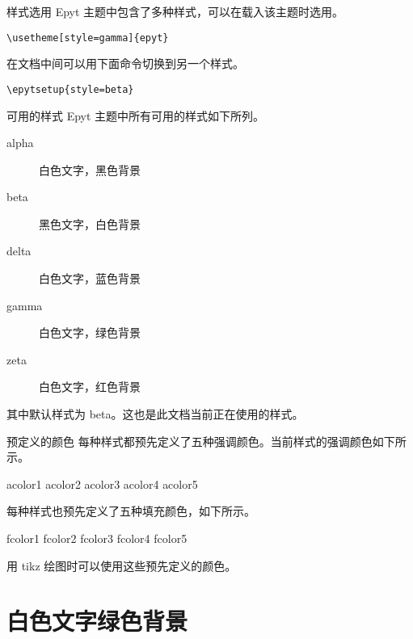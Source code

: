\documentclass[14pt,notheorems]{beamer}
\newcommand{\mylead}[1]{\textcolor{acolor1}{#1}}
\newcommand{\mybold}[1]{\textcolor{acolor2}{#1}}
\begin{document}
\begin{frame}[fragile]{样式选用}
\mylead{Epyt} 主题中包含了多种样式，可以在载入该主题时选用。
\begin{lstlisting}
\usetheme[style=gamma]{epyt}
\end{lstlisting}
\pause 在文档中间可以用下面命令切换到另一个样式。
\begin{lstlisting}
\epytsetup{style=beta}
\end{lstlisting}
\end{frame}

\begin{frame}{可用的样式}
\mylead{Epyt} 主题中所有可用的样式如下所列。
\begin{description}
  \item[alpha] 白色文字，黑色背景
  \item[beta]  黑色文字，白色背景
  \item[delta] 白色文字，蓝色背景
  \item[gamma] 白色文字，绿色背景
  \item[zeta]  白色文字，红色背景
\end{description}
\pause
其中默认样式为 \mybold{beta}。这也是此文档当前正在使用的样式。
\end{frame}

\begin{frame}{预定义的颜色}
每种样式都预先定义了五种强调颜色。当前样式的强调颜色如下所示。
\begin{flushleft}
\textcolor{acolor1}{acolor1}
\textcolor{acolor2}{acolor2}
\textcolor{acolor3}{acolor3}
\textcolor{acolor4}{acolor4}
\textcolor{acolor5}{acolor5}
\end{flushleft}
\pause 每种样式也预先定义了五种填充颜色，如下所示。
\begin{flushleft}
\colorbox{fcolor1}{fcolor1}
\colorbox{fcolor2}{fcolor2}
\colorbox{fcolor3}{fcolor3}
\colorbox{fcolor4}{fcolor4}
\colorbox{fcolor5}{fcolor5}
\end{flushleft}
\pause 用 tikz 绘图时可以使用这些预先定义的颜色。
\end{frame}


\begin{frame}[plain]\transboxout
\titlepage
\end{frame}

\section{白色文字绿色背景}
\end{document}
